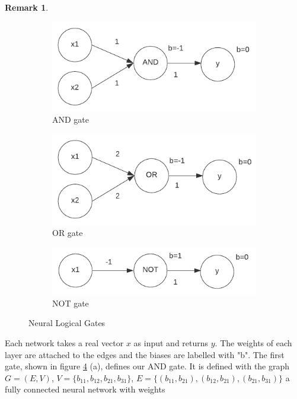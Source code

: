 \documentclass{article}
\theoremstyle{definition}
\newtheorem{remark}[theorem]{Remark}
\begin{document}
\begin{remark}
\begin{figure}[H]
    \centering
    \begin{subfigure}[b]{0.3\textwidth}
    	\centering
        \includegraphics[width=\textwidth]{graphics/AND_gate.pdf}
        \caption{AND gate}
        \label{fig:AND}
    \end{subfigure}
    \begin{subfigure}[b]{0.3\textwidth}
    	\centering
        \includegraphics[width=\textwidth]{graphics/OR_gate.pdf}
        \caption{OR gate}
        \label{fig:OR}
    \end{subfigure}
    \begin{subfigure}[b]{0.3\textwidth}
    	\centering
        \includegraphics[width=\textwidth]{graphics/NOT_gate.pdf}
        \caption{NOT gate}
        \label{fig:NOT}
    \end{subfigure}
    \caption{Neural Logical Gates}\label{fig:neural_logic_gates}
\end{figure}
Each network takes a real vector $x$ as input and returns $y$. The weights of each layer are attached to the edges and the biases are labelled with "b". The first gate, shown in figure \ref{fig:neural_logic_gates} (a), defines our AND gate. It is defined with the graph $G=(E, V)$, $V=\{ b_{11}, b_{12}, b_{21}, b_{31} \}$, $E=\{ (b_{11}, b_{21}), (b_{12}, b_{21}), (b_{21}, b_{31})\}$ a fully connected neural network with weights 

\end{remark}
\end{document}
